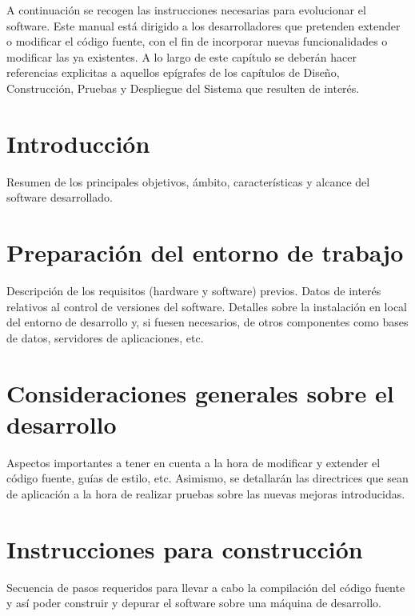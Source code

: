 
A continuación se recogen las instrucciones necesarias para evolucionar el software. Este manual está dirigido a los desarrolladores que pretenden extender o modificar el código fuente, con el fin de incorporar nuevas funcionalidades o modificar las ya existentes. A lo largo de este capítulo se deberán hacer referencias explicitas a aquellos epígrafes de los capítulos de Diseño, Construcción, Pruebas y Despliegue del Sistema que resulten de interés.

\section{Introducción}
Resumen de los principales objetivos, ámbito, características y alcance del software desarrollado.

\section{Preparación del entorno de trabajo}
Descripción de los requisitos (hardware y software) previos. Datos de interés relativos al control de versiones del software. Detalles sobre la instalación en local del entorno de desarrollo y, si fuesen necesarios, de otros componentes como bases de datos, servidores de aplicaciones, etc. 

\section{Consideraciones generales sobre el desarrollo}
Aspectos importantes a tener en cuenta a la hora de modificar y extender el código fuente, guías de estilo, etc. Asimismo, se detallarán las directrices que sean de aplicación a la hora de realizar pruebas sobre las nuevas mejoras introducidas.

\section{Instrucciones para construcción}
Secuencia de pasos requeridos para llevar a cabo la compilación del código fuente y así poder construir y depurar el software sobre una máquina de desarrollo.
